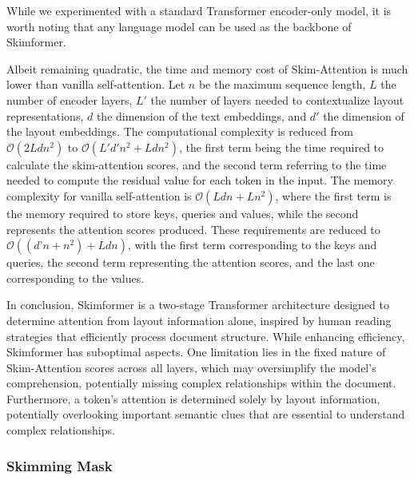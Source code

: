 While we experimented with a standard Transformer encoder-only model, it is worth noting that any language model can be used as the backbone of Skimformer.

Albeit remaining quadratic, the time and memory cost of Skim-Attention is much lower than vanilla self-attention. Let $n$ be the maximum sequence length, $L$ the number of encoder layers, $L'$ the number of layers needed to contextualize layout representations, $d$ the dimension of the text embeddings, and $d'$ the dimension of the layout embeddings. The computational complexity is reduced from $\mathcal{O}(2Ldn^2)$ to $\mathcal{O}(L'd'n^2 + Ldn^2)$, the first term being the time required to calculate the skim-attention scores, and the second term referring to the time needed to compute the residual value for each token in the input. The memory complexity for vanilla self-attention is $\mathcal{O}(Ldn + Ln^2)$, where the first term is the memory required to store keys, queries and values, while the second represents the attention scores produced. These requirements are reduced to $\mathcal{O}((d’n + n^2) + Ldn)$, with the first term corresponding to the keys and queries, the second term representing the attention scores, and the last one corresponding to the values.

In conclusion, Skimformer is a two-stage Transformer architecture designed to determine attention from layout information alone, inspired by human reading strategies that efficiently process document structure. While enhancing efficiency, Skimformer has suboptimal aspects. One limitation lies in the fixed nature of Skim-Attention scores across all layers, which may oversimplify the model's comprehension, potentially missing complex relationships within the document. Furthermore, a token's attention is determined solely by layout information, potentially overlooking important semantic clues that are essential to understand complex relationships.

\subsubsection{Skimming Mask}


